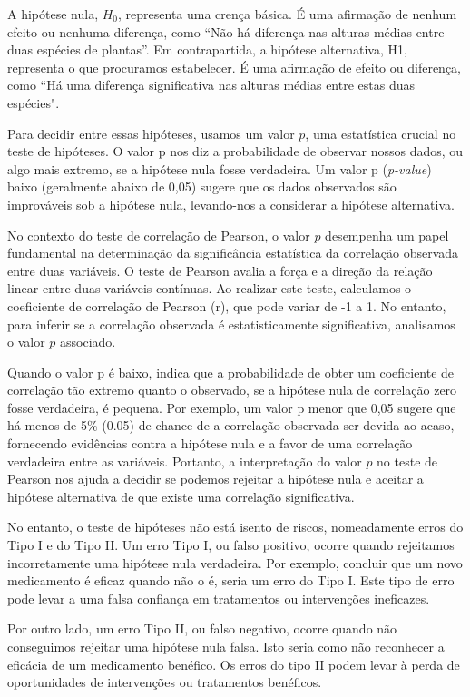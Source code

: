 \documentclass[article]{memoir}
\begin{document}
A hipótese nula, $H_0$, representa uma crença básica. É uma afirmação de nenhum efeito ou nenhuma diferença, como “Não há diferença nas alturas médias entre duas espécies de plantas”. Em contrapartida, a hipótese alternativa, H1, representa o que procuramos estabelecer. É uma afirmação de efeito ou diferença, como ``Há uma diferença significativa nas alturas médias entre estas duas espécies".

Para decidir entre essas hipóteses, usamos um valor $p$, uma estatística crucial no teste de hipóteses. O valor p nos diz a probabilidade de observar nossos dados, ou algo mais extremo, se a hipótese nula fosse verdadeira. Um valor p (\textit{p-value}) baixo (geralmente abaixo de 0,05) sugere que os dados observados são improváveis sob a hipótese nula, levando-nos a considerar a hipótese alternativa.

No contexto do teste de correlação de Pearson, o valor $p$ desempenha um papel fundamental na determinação da significância estatística da correlação observada entre duas variáveis. O teste de Pearson avalia a força e a direção da relação linear entre duas variáveis contínuas. Ao realizar este teste, calculamos o coeficiente de correlação de Pearson (r), que pode variar de -1 a 1. No entanto, para inferir se a correlação observada é estatisticamente significativa, analisamos o valor $p$ associado.

Quando o valor p é baixo, indica que a probabilidade de obter um coeficiente de correlação tão extremo quanto o observado, se a hipótese nula de correlação zero fosse verdadeira, é pequena. Por exemplo, um valor p menor que 0,05 sugere que há menos de 5\% (0.05) de chance de a correlação observada ser devida ao acaso, fornecendo evidências contra a hipótese nula e a favor de uma correlação verdadeira entre as variáveis. Portanto, a interpretação do valor $p$ no teste de Pearson nos ajuda a decidir se podemos rejeitar a hipótese nula e aceitar a hipótese alternativa de que existe uma correlação significativa.

No entanto, o teste de hipóteses não está isento de riscos, nomeadamente erros do Tipo I e do Tipo II. Um erro Tipo I, ou falso positivo, ocorre quando rejeitamos incorretamente uma hipótese nula verdadeira. Por exemplo, concluir que um novo medicamento é eficaz quando não o é, seria um erro do Tipo I. Este tipo de erro pode levar a uma falsa confiança em tratamentos ou intervenções ineficazes.

Por outro lado, um erro Tipo II, ou falso negativo, ocorre quando não conseguimos rejeitar uma hipótese nula falsa. Isto seria como não reconhecer a eficácia de um medicamento benéfico. Os erros do tipo II podem levar à perda de oportunidades de intervenções ou tratamentos benéficos.
\end{document}
